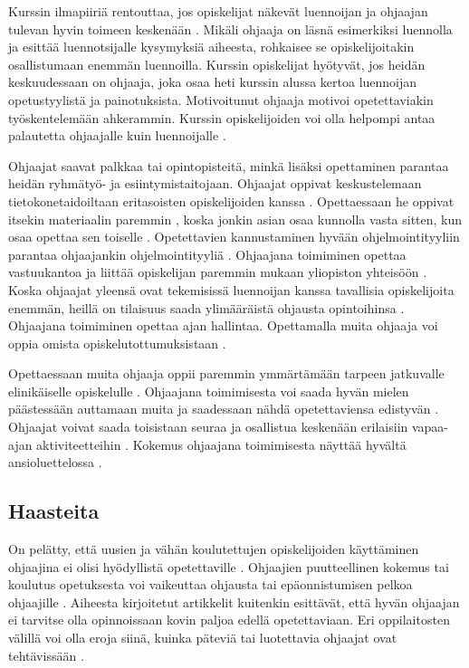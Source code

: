\documentclass[finnish]{tktltiki2}
\theoremstyle{definition}
\theoremstyle{remark}
\begin{document}
Kurssin ilmapiiriä rentouttaa, jos opiskelijat näkevät luennoijan ja ohjaajan tulevan hyvin toimeen keskenään \cite{Dickson11}. Mikäli ohjaaja on läsnä esimerkiksi luennolla ja esittää luennotsijalle kysymyksiä aiheesta, rohkaisee se opiskelijoitakin osallistumaan enemmän luennoilla. Kurssin opiskelijat hyötyvät, jos heidän keskuudessaan on ohjaaja, joka osaa heti kurssin alussa kertoa luennoijan opetustyylistä ja painotuksista. Motivoitunut ohjaaja motivoi opetettaviakin työskentelemään ahkerammin. Kurssin opiskelijoiden voi olla helpompi antaa palautetta ohjaajalle kuin luennoijalle \cite{Morgan02}. \par

Ohjaajat saavat palkkaa tai opintopisteitä, minkä lisäksi opettaminen parantaa heidän ryhmätyö- ja esiintymistaitojaan. Ohjaajat oppivat keskustelemaan tietokonetaidoiltaan eritasoisten opiskelijoiden kanssa \cite{Vikberg}. Opettaessaan he oppivat itsekin materiaalin paremmin \cite{Reges03}, koska jonkin asian osaa kunnolla vasta sitten, kun osaa opettaa sen toiselle \cite{Bernstein, Dickson11}. Opetettavien kannustaminen hyvään ohjelmointityyliin parantaa ohjaajankin ohjelmointityyliä \cite{Roberts95}. Ohjaajana toimiminen opettaa vastuukantoa ja liittää opiskelijan paremmin mukaan yliopiston yhteisöön \cite{Dickson11}. Koska ohjaajat yleensä ovat tekemisissä luennoijan kanssa tavallisia opiskelijoita enemmän, heillä on tilaisuus saada ylimääräistä ohjausta opintoihinsa \cite{Aminzadeh}. Ohjaajana toimiminen opettaa ajan hallintaa. Opettamalla muita ohjaaja voi oppia omista opiskelutottumuksistaan \cite{Ferstl10}.  \par

Opettaessaan muita ohjaaja oppii paremmin ymmärtämään tarpeen jatkuvalle elinikäiselle opiskelulle \cite{Paxton05}. Ohjaajana toimimisesta voi saada hyvän mielen päästessään auttamaan muita \cite{Aminzadeh} ja saadessaan nähdä opetettaviensa edistyvän \cite{Kurhila11}. Ohjaajat voivat saada toisistaan seuraa ja osallistua keskenään erilaisiin vapaa-ajan aktiviteetteihin \cite{Roberts95}. Kokemus ohjaajana toimimisesta näyttää hyvältä ansioluettelossa \cite{Ferstl10}. \par




\subsection{Haasteita}
On pelätty, että uusien ja vähän koulutettujen opiskelijoiden käyttäminen ohjaajina ei olisi hyödyllistä opetettaville \cite{Harper02}. Ohjaajien puutteellinen kokemus tai koulutus opetuksesta voi vaikeuttaa ohjausta tai epäonnistumisen pelkoa ohjaajille \cite{Mark11}. Aiheesta kirjoitetut artikkelit kuitenkin esittävät, että hyvän ohjaajan ei tarvitse olla opinnoissaan kovin paljoa edellä opetettaviaan. Eri oppilaitosten välillä voi olla eroja siinä, kuinka päteviä tai luotettavia ohjaajat ovat tehtävissään \cite{Reges03}. \par
\end{document}
